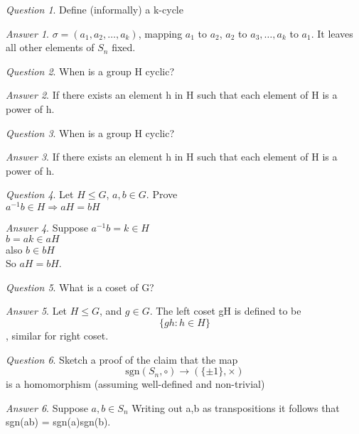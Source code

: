 \documentclass[]{article}
\theoremstyle{remark}
\theoremstyle{qnstyle}
\newtheorem{question}{Question}
\theoremstyle{answerstyle}
\newtheorem*{answer}{Answer}
\begin{document}
{
    \begin{question}
        Define (informally) a k-cycle
    \end{question}
    \begin{answer}
        $\sigma = (a_1, a_2, \ldots, a_k)$,
mapping $a_1$ to $a_2$, $a_2$ to $a_3, \ldots, a_k$ to $a_1$. It leaves all other elements of $S_n$ fixed.
    \end{answer}
}
{
    \begin{question}
        When is a group H cyclic?
    \end{question}
    \begin{answer}
        If there exists an element h in H such that each element of H is a power of h. 
    \end{answer}
}
{
    \begin{question}
        When is a group H cyclic?
    \end{question}
    \begin{answer}
        If there exists an element h in H such that each element of H is a power of h. 
    \end{answer}
}
{
    \begin{question}
        Let $H \leq G$, $a,b \in G$. Prove\\
        $a^{-1}b \in H \Rightarrow aH = bH$
    \end{question}
    \begin{answer}
        Suppose $a^{-1}b = k \in H$\\
        $b = ak \in aH$\\
        also $b \in bH$\\
        So $aH = bH$.
    \end{answer}
}
{
    \begin{question}
        What is a coset of G?
    \end{question}
    \begin{answer}
        Let $H \leq G$, and $g \in G$. The left coset gH is defined to be
        $$\{gh: h \in H\}$$, similar for right coset.
    \end{answer}
}
{
    \begin{question}
        Sketch a proof of the claim that the map
        $$\text{sgn}(S_n, \circ) \to (\{ \pm 1\}, \times)$$
        is a homomorphism (assuming well-defined and non-trivial)
    \end{question}
    \begin{answer}
        Suppose $a,b \in S_n$
        Writing out a,b as transpositions it follows that sgn(ab) = sgn(a)sgn(b).
    \end{answer}
}
\end{document}
